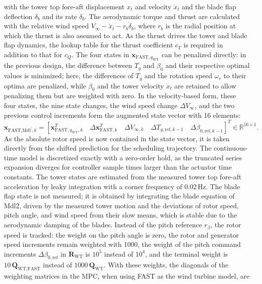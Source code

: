 with the tower top fore-aft displacement $x_t$ and velocity $\dot{x}_t$ and the blade flap deflection $\delta_b$ and its rate $\dot{\delta}_b$. The aerodynamic torque and thrust are calculated with the relative wind speed $V_\infty - \dot{x}_t - r_b\dot{\delta}_b$, where $r_b$ is the radial position at which the thrust is also assumed to act. As the thrust drives the tower and blade flap dynamics, the lookup table for the thrust coefficient $c_T$ is required in addition to that for $c_Q$. The four states in $\bm{x}_{\text{FAST},q_{\text{WT}}}$ can be penalized directly: in the previous design, the difference between $T_g$ and $\beta_0$ and their respective optimal values is minimized; here, the differences of $T_g$ and the rotation speed $\omega_r$ to their optima are penalized, while $\beta_0$ and the tower velocity $\dot{x}_t$ are retained to allow penalizing them but are weighted with zero. In the velocity-based form, these four states, the nine state changes, the wind speed change $\Delta V_\infty$, and the two previous control increments form the augmented state vector with 16 elements:
\begin{equation*}
    \bm{x}_{\text{FAST,Mdl}^\prime,k} = [\bm{x}_{\text{FAST},q_{\text{WT}},k}^T \quad \Delta\bm{x}_{\text{FAST},k}^T \quad \Delta V_{\infty,k} \quad \Delta T_{g,\text{ref},k-1} \quad \Delta\beta_{0,\text{ref},k-1}]^T \in \mathbb{R}^{16 \times 1}.
\end{equation*}
As the absolute rotor speed is now contained in the state vector, it is taken directly from the shifted prediction for the scheduling trajectory. The continuous-time model is discretized exactly with a zero-order hold, as the truncated series expansion diverges for controller sample times larger than the actuator time constants. The tower states are estimated from the measured tower top fore-aft acceleration by leaky integration with a corner frequency of 0.02\,Hz. The blade flap state is not measured; it is obtained by integrating the blade equation of Mdl2, driven by the measured tower motion and the deviations of rotor speed, pitch angle, and wind speed from their slow means, which is stable due to the aerodynamic damping of the blades. Instead of the pitch reference $r_\beta$, the rotor speed is tracked: the weight on the pitch angle is zero, the rotor and generator speed increments remain weighted with 1000, the weight of the pitch command increments $\Delta\beta_{0,\text{ref}}$ in $\bm{R}_{\text{WT}}$ is $10^5$ instead of $10^4$, and the terminal weight is $10\,\bm{Q}_{\text{WT,FAST}}$ instead of $1000\,\bm{Q}_{\text{WT}}$. With these weights, the diagonals of the weighting matrices in the MPC, when using FAST as the wind turbine model, are
